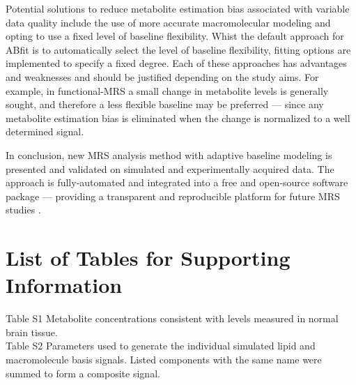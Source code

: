\documentclass[num-refs]{wiley-article}
\begin{document}
Potential solutions to reduce metabolite estimation bias associated with variable data quality include the use of more accurate macromolecular modeling \cite{Birch2017} and opting to use a fixed level of baseline flexibility. Whist the default approach for ABfit is to automatically select the level of baseline flexibility, fitting options are implemented to specify a fixed degree. Each of these approaches has advantages and weaknesses and should be justified depending on the study aims. For example, in functional-MRS a small change in metabolite levels is generally sought, and therefore a less flexible baseline may be preferred --- since any metabolite estimation bias is eliminated when the change is normalized to a well determined signal.




In conclusion, new MRS analysis method with adaptive baseline modeling is presented and validated on simulated and experimentally acquired data. The approach is fully-automated and integrated into a free and open-source software package --- providing a transparent and reproducible platform for future MRS studies \cite{Stikov2019}.




\clearpage
\listoffigures

\section*{List of Tables for Supporting Information}
Table S1 Metabolite concentrations consistent with levels measured in normal brain tissue. \\
Table S2 Parameters used to generate the individual simulated lipid and macromolecule basis signals. Listed components with the same name were summed to form a composite signal. \\
\end{document}
